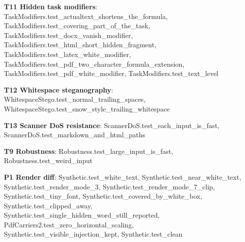 \documentclass[10pt,a4paper]{article}
\begin{document}
\textbf{T11 Hidden task modifiers}: \textcolor{ok}{TaskModifiers.\allowbreak{}test\_\allowbreak{}actualtext\_\allowbreak{}shortens\_\allowbreak{}the\_\allowbreak{}formula}, \textcolor{ok}{TaskModifiers.\allowbreak{}test\_\allowbreak{}covering\_\allowbreak{}part\_\allowbreak{}of\_\allowbreak{}the\_\allowbreak{}task}, \textcolor{ok}{TaskModifiers.\allowbreak{}test\_\allowbreak{}docx\_\allowbreak{}vanish\_\allowbreak{}modifier}, \textcolor{ok}{TaskModifiers.\allowbreak{}test\_\allowbreak{}html\_\allowbreak{}short\_\allowbreak{}hidden\_\allowbreak{}fragment}, \textcolor{ok}{TaskModifiers.\allowbreak{}test\_\allowbreak{}latex\_\allowbreak{}white\_\allowbreak{}modifier}, \textcolor{ok}{TaskModifiers.\allowbreak{}test\_\allowbreak{}pdf\_\allowbreak{}two\_\allowbreak{}character\_\allowbreak{}formula\_\allowbreak{}extension}, \textcolor{ok}{TaskModifiers.\allowbreak{}test\_\allowbreak{}pdf\_\allowbreak{}white\_\allowbreak{}modifier}, \textcolor{ok}{TaskModifiers.\allowbreak{}test\_\allowbreak{}text\_\allowbreak{}level}\par
\textbf{T12 Whitespace steganography}: \textcolor{ok}{WhitespaceStego.\allowbreak{}test\_\allowbreak{}normal\_\allowbreak{}trailing\_\allowbreak{}spaces}, \textcolor{ok}{WhitespaceStego.\allowbreak{}test\_\allowbreak{}snow\_\allowbreak{}style\_\allowbreak{}trailing\_\allowbreak{}whitespace}\par
\textbf{T13 Scanner DoS resistance}: \textcolor{ok}{ScannerDoS.\allowbreak{}test\_\allowbreak{}each\_\allowbreak{}input\_\allowbreak{}is\_\allowbreak{}fast}, \textcolor{ok}{ScannerDoS.\allowbreak{}test\_\allowbreak{}markdown\_\allowbreak{}and\_\allowbreak{}html\_\allowbreak{}paths}\par
\textbf{T9 Robustness}: \textcolor{ok}{Robustness.\allowbreak{}test\_\allowbreak{}large\_\allowbreak{}input\_\allowbreak{}is\_\allowbreak{}fast}, \textcolor{ok}{Robustness.\allowbreak{}test\_\allowbreak{}weird\_\allowbreak{}input}\par
\textbf{P1 Render diff}: \textcolor{ok}{Synthetic.\allowbreak{}test\_\allowbreak{}white\_\allowbreak{}text}, \textcolor{ok}{Synthetic.\allowbreak{}test\_\allowbreak{}near\_\allowbreak{}white\_\allowbreak{}text}, \textcolor{ok}{Synthetic.\allowbreak{}test\_\allowbreak{}render\_\allowbreak{}mode\_\allowbreak{}3}, \textcolor{ok}{Synthetic.\allowbreak{}test\_\allowbreak{}render\_\allowbreak{}mode\_\allowbreak{}7\_\allowbreak{}clip}, \textcolor{ok}{Synthetic.\allowbreak{}test\_\allowbreak{}tiny\_\allowbreak{}font}, \textcolor{ok}{Synthetic.\allowbreak{}test\_\allowbreak{}covered\_\allowbreak{}by\_\allowbreak{}white\_\allowbreak{}box}, \textcolor{ok}{Synthetic.\allowbreak{}test\_\allowbreak{}clipped\_\allowbreak{}away}, \textcolor{ok}{Synthetic.\allowbreak{}test\_\allowbreak{}single\_\allowbreak{}hidden\_\allowbreak{}word\_\allowbreak{}still\_\allowbreak{}reported}, \textcolor{ok}{PdfCarriers2.\allowbreak{}test\_\allowbreak{}zero\_\allowbreak{}horizontal\_\allowbreak{}scaling}, \textcolor{ok}{Synthetic.\allowbreak{}test\_\allowbreak{}visible\_\allowbreak{}injection\_\allowbreak{}kept}, \textcolor{ok}{Synthetic.\allowbreak{}test\_\allowbreak{}clean}\par
\end{document}
